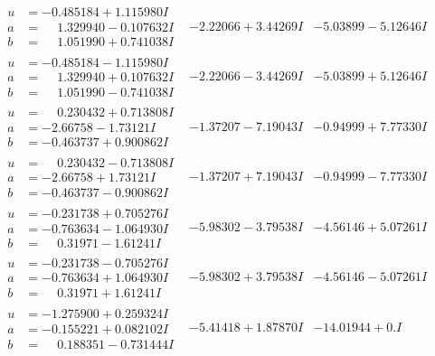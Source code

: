 \documentclass[1p]{elsarticle_modified}
\theoremstyle{definition}
\begin{document}
$$\begin{array}{c|c|c}
\begin{aligned}
u &= -0.485184 + 1.115980 I \\
a &= \phantom{-}1.329940 - 0.107632 I \\
b &= \phantom{-}1.051990 + 0.741038 I\end{aligned}
 & -2.22066 + 3.44269 I & -5.03899 - 5.12646 I \\ \hline\begin{aligned}
u &= -0.485184 - 1.115980 I \\
a &= \phantom{-}1.329940 + 0.107632 I \\
b &= \phantom{-}1.051990 - 0.741038 I\end{aligned}
 & -2.22066 - 3.44269 I & -5.03899 + 5.12646 I \\ \hline\begin{aligned}
u &= \phantom{-}0.230432 + 0.713808 I \\
a &= -2.66758 - 1.73121 I \\
b &= -0.463737 + 0.900862 I\end{aligned}
 & -1.37207 - 7.19043 I & -0.94999 + 7.77330 I \\ \hline\begin{aligned}
u &= \phantom{-}0.230432 - 0.713808 I \\
a &= -2.66758 + 1.73121 I \\
b &= -0.463737 - 0.900862 I\end{aligned}
 & -1.37207 + 7.19043 I & -0.94999 - 7.77330 I \\ \hline\begin{aligned}
u &= -0.231738 + 0.705276 I \\
a &= -0.763634 - 1.064930 I \\
b &= \phantom{-}0.31971 - 1.61241 I\end{aligned}
 & -5.98302 - 3.79538 I & -4.56146 + 5.07261 I \\ \hline\begin{aligned}
u &= -0.231738 - 0.705276 I \\
a &= -0.763634 + 1.064930 I \\
b &= \phantom{-}0.31971 + 1.61241 I\end{aligned}
 & -5.98302 + 3.79538 I & -4.56146 - 5.07261 I \\ \hline\begin{aligned}
u &= -1.275900 + 0.259324 I \\
a &= -0.155221 + 0.082102 I \\
b &= \phantom{-}0.188351 - 0.731444 I\end{aligned}
 & -5.41418 + 1.87870 I & -14.01944 + 0. I\phantom{ +0.000000I} \\ \hline\begin{aligned}

\end{aligned}
\end{array}$$
\end{document}
